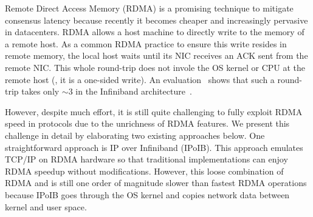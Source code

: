 


Remote Direct Access Memory (RDMA) is a promising technique to mitigate 
consensus latency because recently it becomes cheaper and increasingly 
pervasive in datacenters. RDMA allows a host machine to directly write to the 
memory of a remote host. As a common RDMA practice to ensure this write resides 
in remote memory, the local host waits until its NIC receives an ACK sent from 
the remote NIC. This whole round-trip does not invole the OS kernel or CPU at 
the remote host (\ie, it is a one-sided write). An 
evaluation~\cite{pilaf:atc14} shows that such a round-trip takes only $\sim$3 
\us in the Infiniband architecture~\cite{infiniband}.

However, despite much effort, it is still quite challenging to fully exploit 
RDMA speed in \paxos protocols due to the unrichness of RDMA features. We 
present this challenge in detail by elaborating two existing approaches 
below. One straightforward approach is IP over Infiniband (IPoIB). This 
approach emulates TCP/IP on RDMA hardware so that traditional \paxos 
implementations can enjoy RDMA speedup without modifications. However, this 
loose combination of RDMA and \paxos is still one order of magnitude slower 
than fastest RDMA operations because IPoIB goes through the OS kernel and 
copies network data between kernel and user space.

